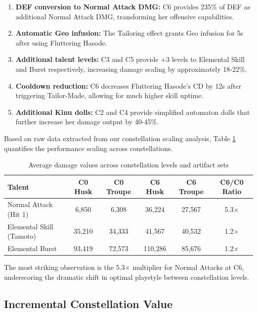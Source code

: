\documentclass[12pt,a4paper]{article}
\begin{document}
\begin{enumerate}
    \item \textbf{DEF conversion to Normal Attack DMG:} C6 provides 235\% of DEF as additional Normal Attack DMG, transforming her offensive capabilities.
    \item \textbf{Automatic Geo infusion:} The Tailoring effect grants Geo infusion for 5s after using Fluttering Hasode.
    \item \textbf{Additional talent levels:} C3 and C5 provide +3 levels to Elemental Skill and Burst respectively, increasing damage scaling by approximately 18-22\%.
    \item \textbf{Cooldown reduction:} C6 decreases Fluttering Hasode's CD by 12s after triggering Tailor-Made, allowing for much higher skill uptime.
    \item \textbf{Additional Kinu dolls:} C2 and C4 provide simplified automaton dolls that further increase her damage output by 40-45\%.
\end{enumerate}

Based on raw data extracted from our constellation scaling analysis, Table \ref{tab:constellation_scaling} quantifies the performance scaling across constellations.

\begin{table}[h]
\centering
\begin{tabular}{lccccc}
\toprule
\textbf{Talent} & \textbf{C0 Husk} & \textbf{C0 Troupe} & \textbf{C6 Husk} & \textbf{C6 Troupe} & \textbf{C6/C0 Ratio} \\
\midrule
Normal Attack (Hit 1) & 6,850 & 6,308 & 36,224 & 27,567 & 5.3× \\
Elemental Skill (Tamoto) & 35,210 & 34,333 & 41,567 & 40,532 & 1.2× \\
Elemental Burst & 93,419 & 72,573 & 110,286 & 85,676 & 1.2× \\
\bottomrule
\end{tabular}
\caption{Average damage values across constellation levels and artifact sets}
\label{tab:constellation_scaling}
\end{table}

The most striking observation is the 5.3× multiplier for Normal Attacks at C6, underscoring the dramatic shift in optimal playstyle between constellation levels.

\subsection{Incremental Constellation Value}
\end{document}
